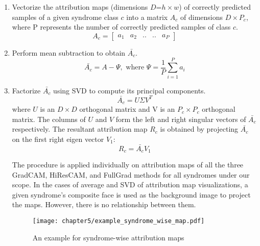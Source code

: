 \documentclass[../report.tex]{subfiles}
\begin{document}
	\begin{enumerate}
		\item Vectorize the attribution maps (dimensions $D$=$h\times w$) of correctly predicted samples of a given syndrome class $c$ into a matrix $A_{c}$ of dimensions  $D\times P_{c}$, where P represents the number of correctly predicted samples of class $c$.
		\begin{equation*}
		A_{c} =	
		\begin{bmatrix}
			a_1 & a_2 & .. & .. & a_P 
		\end{bmatrix} 
	\end{equation*}
		\item Perform mean subtraction to obtain $\bar{A_{c}}$.
		\begin{equation*}
			\bar{A_{c}} = A - \Psi, \text{ where }  \Psi=\frac{1}{P}\sum^P_{i=1} a_i
		\end{equation*}
	
		
		\item Factorize $\bar{A_{c}}$ using SVD to compute its principal components.
		\begin{equation*}
			\bar{A_{c}} = U \Sigma {V}^T
		\end{equation*}
		where $U$ is an $D \times D$ orthogonal matrix and V is an $P_{c} \times P_{c}$ orthogonal matrix.  The columns of $U$ and $V$ form the left and right singular vectors of $\bar{A_{c}}$ respectively. The resultant attribution map $R_{c}$ is obtained by projecting $\bar{A_c}$ on the first right eigen vector $V_{1}$:
		\begin{equation*}
			R_{c} = \bar{A_{c}}V_{1}
		\end{equation*}
	
	The procedure is applied individually on attribution maps of all the three GradCAM, HiResCAM, and FullGrad methods for all syndromes under our scope. In the cases of average and SVD of attribution map visualizations, a given syndrome's composite face is used as the background image to project the maps. However, there is no relationship between them.
	\begin{figure}[H]
		\hspace*{0cm}      
		\texttt{[image: chapter5/example\_syndrome\_wise\_map.pdf]}
		\caption{An example for syndrome-wise attribution maps}
		\label{fig_synd_maps}
	\end{figure}
	\end{enumerate}    
\end{document}
